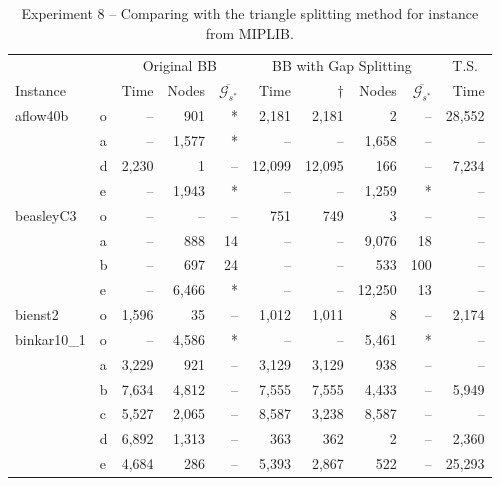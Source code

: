 \documentclass[11.5pt]{article}
\begin{document}
 \begin{table}[H]
\centering
\caption{Experiment 8 -- Comparing with the triangle splitting method for instance from MIPLIB.}\label{table_results}
\begin{tabular}{l|l|rrr|rrrr|r}
\toprule
 &  & \multicolumn{3}{c}{Original BB}  & \multicolumn{4}{c}{BB with Gap Splitting} %
 & \multicolumn{1}{c}{ T.S.} 	\\ 
\cmidrule(r){3-5}
\cmidrule(r){6-9}
\cmidrule(r){10-10}
Instance &  & Time & Nodes & $\overline{\mathcal{G}_{s^*}}$ & Time & $\dagger$ & Nodes & $\overline{\mathcal{G}_{s^*}}$& Time \\
\midrule
aflow40b          & o   & --    & 901   & *  & 2,181  & 2,181  & 2    & --  & 28,552 \\
                  & a   & --    & 1,577 & *  & --     & --     & 1,658& --  & --\\
		          & d    & 2,230 & 1     & -- & 12,099 & 12,095 & 166  & --  & 7,234 \\
		          & e   & --    & 1,943  & *  & --     & --     & 1,259& *   & -- \\
beasleyC3         & o   & --    & --    & -- & 751    & 749    & 3    & --  & -- \\
                  & a   & --    & 888   & 14 & --     & --     & 9,076& 18  & -- \\
                  & b   & --    & 697   & 24 & --     & --     & 533  & 100 & -- \\
                  & e   & --    & 6,466 & *  & --     & --     &12,250& 13  & -- \\
bienst2           & o & 1,596 & 35    & -- & 1,012  & 1,011 & 8     & --   & 2,174 \\
binkar10\_1       & o & --    & 4,586 & *  & --     & --    & 5,461 & *    & -- \\
                  & a & 3,229 & 921   & -- & 3,129  & 3,129 & 938   & --   & -- \\
                  & b & 7,634 & 4,812 & -- & 7,555  & 7,555 & 4,433 & --   & 5,949 \\
                  & c & 5,527 & 2,065 & -- & 8,587  & 3,238 & 8,587 & --   & -- \\
                  & d & 6,892 & 1,313 & -- &  363   & 362   & 2     & --   & 2,360 \\
                  & e & 4,684 & 286   & -- & 5,393  & 2,867 & 522   & --   & 25,293 \\

\end{tabular}
\end{table}
\end{document}
